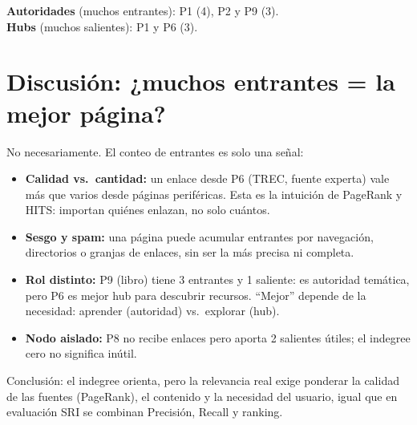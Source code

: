 \documentclass[10pt,a4paper,twocolumn]{article}
\begin{document}
\textbf{Autoridades} (muchos entrantes): P1 (4), P2 y P9 (3). \\
\textbf{Hubs} (muchos salientes): P1 y P6 (3).

\section{Discusión: ¿muchos entrantes = la mejor página?}
No necesariamente. El conteo de entrantes es solo una señal:

\begin{itemize}
  \item \textbf{Calidad vs.\ cantidad:} un enlace desde P6 (TREC, fuente experta) vale más que varios desde páginas periféricas. Esta es la intuición de PageRank y HITS: importan quiénes enlazan, no solo cuántos.
  \item \textbf{Sesgo y spam:} una página puede acumular entrantes por navegación, directorios o granjas de enlaces, sin ser la más precisa ni completa.
  \item \textbf{Rol distinto:} P9 (libro) tiene 3 entrantes y 1 saliente: es autoridad temática, pero P6 es mejor hub para descubrir recursos. ``Mejor'' depende de la necesidad: aprender (autoridad) vs.\ explorar (hub).
  \item \textbf{Nodo aislado:} P8 no recibe enlaces pero aporta 2 salientes útiles; el indegree cero no significa inútil.
\end{itemize}

Conclusión: el indegree orienta, pero la relevancia real exige ponderar la calidad de las fuentes (PageRank), el contenido y la necesidad del usuario, igual que en evaluación SRI se combinan Precisión, Recall y ranking.
\end{document}

